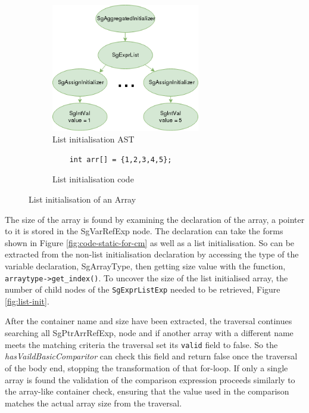 \documentclass[bsc,frontabs,singlespacing,twoside,parskip,deptreport]{infthesis}
\begin{document}
\begin{figure}[H]
    \begin{subfigure}[b]{0.5\textwidth}
        \centering
        \includegraphics[height=5.6cm]{images/init-list.png}
        \caption{List initialisation AST}
        \label{fig:list-init-AST-var}
    \end{subfigure}
    \hfill
    \begin{subfigure}[b]{0.5\textwidth}
        \centering
        \begin{verbatim}
    int arr[] = {1,2,3,4,5};
        \end{verbatim}
        \caption{List initialisation code}
        \label{fig:list-init-var-code}
    \end{subfigure}
    \vspace{-0.5cm}
    \caption{List initialisation of an Array}
    \label{fig:list-init-var}
\end{figure}

The size of the array is found by examining the declaration of the array, a pointer to it is stored in the SgVarRefExp node. The declaration can take the forms shown in Figure \ref{fig:code-static-for-cm} as well as a list initialisation. So  can be extracted from the non-list initialisation declaration by accessing the type of the variable declaration, SgArrayType, then getting size value with the function, \texttt{arraytype->get\_index()}. To uncover the size of the list initialised array, the number of child nodes of the \texttt{SgExprListExp} needed to be retrieved, Figure \ref{fig:list-init}. 

After the container name and size have been extracted, the traversal continues searching all SgPtrArrRefExp, node and if another array with a different name meets the matching criteria the traversal set its \texttt{valid} field to false. So the \textit{hasVaildBasicComparitor} can check this field and return false once the traversal of the body end, stopping the transformation of that for-loop. If only a single array is found the validation of the comparison expression proceeds similarly to the array-like container check, ensuring that the value used in the comparison matches the actual array size from the traversal.  
\end{document}
